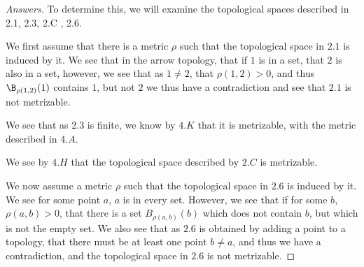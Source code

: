 \begin{proof}[Answers]
  To determine this, we will examine the topological spaces described
  in 2.1, 2.3, 2.C , 2.6.

  We first assume that there is a metric $\rho$ such that the
  topological space in $2.1$ is induced by it. We see that in the
  arrow topology, that if $1$ is in a set, that $2$ is also in a set,
  however, we see that as $1\neq 2$, that $\rho(1,2)>0$, and thus
  $\B_{\rho(1,2)}(1)$ contains $1$, but not $2$ we thus have a
  contradiction and see that $2.1$ is not metrizable.

  We see that as 2.3 is finite, we know by $4.K$ that it is
  metrizable, with the metric described in $4.A$.

  We see by $4.H$ that the topological space described by $2.C$ is
  metrizable.

  We now assume a metric $\rho$ such that the
  topological space in $2.6$ is induced by it. We see for some point
  $a$, $a$ is in every set. However, we see that if for some $b$,
  $\rho(a,b)>0$, that there is a set $B_{\rho(a,b)}(b)$ which does not
  contain $b$, but which is not the empty set. We also see that as
  $2.6$ is obtained by adding  a point to a topology, that there must
  be at least one point $b \neq a$, and thus we have a contradiction,
  and the topological space in $2.6$ is not metrizable.
\end{proof}